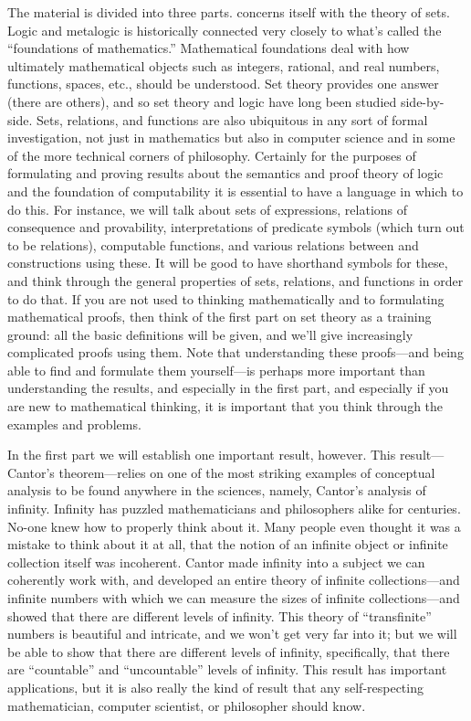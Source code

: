 The material is divided into three parts.  concerns
itself with the theory of sets. Logic and metalogic is historically
connected very closely to what's called the ``foundations of
mathematics.''  Mathematical foundations deal with how ultimately
mathematical objects such as integers, rational, and real numbers,
functions, spaces, etc., should be understood. Set theory provides
one answer (there are others), and so set theory and logic have long
been studied side-by-side. Sets, relations, and functions are also
ubiquitous in any sort of formal investigation, not just in
mathematics but also in computer science and in some of the more
technical corners of philosophy. Certainly for the purposes of
formulating and proving results about the semantics and proof theory
of logic and the foundation of computability it is essential to have a
language in which to do this. For instance, we will talk about sets
of expressions, relations of consequence and provability,
interpretations of predicate symbols (which turn out to be relations),
computable functions, and various relations between and constructions
using these. It will be good to have shorthand symbols for
these, and think through the general properties of sets, relations,
and functions in order to do that. If you are not used to thinking
mathematically and to formulating mathematical proofs, then think of
the first part on set theory as a training ground: all the basic
definitions will be given, and we'll give increasingly complicated
proofs using them. Note that understanding these proofs---and being
able to find and formulate them yourself---is perhaps more important
than understanding the results, and especially in the first part, and
especially if you are new to mathematical thinking, it is important
that you think through the examples and problems.

In the first part we will establish one important result, however.
This result---Cantor's theorem---relies on one of the most striking
examples of conceptual analysis to be found anywhere in the sciences,
namely, Cantor's analysis of infinity. Infinity has puzzled
mathematicians and philosophers alike for centuries. No-one knew how
to properly think about it. Many people even thought it was a mistake
to think about it at all, that the notion of an infinite object or
infinite collection itself was incoherent. Cantor made infinity into
a subject we can coherently work with, and developed an entire theory
of infinite collections---and infinite numbers with which we can
measure the sizes of infinite collections---and showed that there are
different levels of infinity. This theory of ``transfinite'' numbers
is beautiful and intricate, and we won't get very far into it; but we
will be able to show that there are different levels of infinity,
specifically, that there are ``countable'' and ``uncountable'' levels
of infinity. This result has important applications, but it is
also really the kind of result that any self-respecting mathematician,
computer scientist, or philosopher should know.

